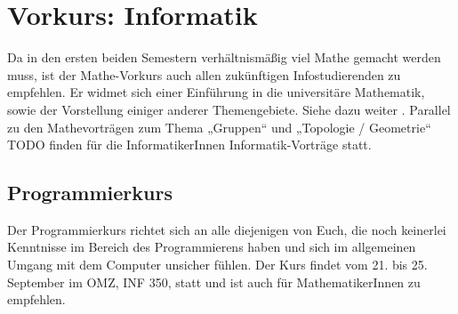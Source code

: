 \section{Vorkurs: Informatik}
\label{vkinfo}
Da in den ersten beiden Semestern verhältnismäßig viel Mathe gemacht werden muss, ist der Mathe-Vorkurs auch allen zukünftigen Infostudierenden zu empfehlen. Er widmet sich einer Einführung in die universitäre Mathematik, sowie der Vorstellung einiger anderer Themengebiete. Siehe dazu weiter
.
Parallel zu den Mathevorträgen zum Thema „Gruppen“ und „Topologie / Geometrie“ TODO finden für die InformatikerInnen Informatik-Vorträge statt.

\parskip

\subsection{Programmierkurs}
Der Programmierkurs richtet sich an alle diejenigen von Euch, die noch keinerlei Kenntnisse im Bereich des Programmierens haben und sich im allgemeinen Umgang mit dem Computer unsicher fühlen. Der Kurs findet vom 21. bis 25. September im OMZ, \gls{INF} 350, statt und ist auch für MathematikerInnen zu empfehlen.



